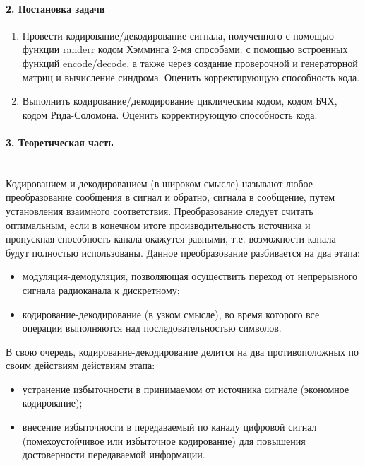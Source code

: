 \documentclass[12pt,a4paper]{report}
\begin{document}
\paragraph{2. Постановка задачи\\}
\begin{enumerate}
\item Провести кодирование/декодирование сигнала, полученного с
помощью функции randerr кодом Хэмминга 2-мя способами: с
помощью встроенных функций encode/decode, а также через
создание проверочной и генераторной матриц и вычисление
синдрома. Оценить корректирующую способность кода.
\item Выполнить кодирование/декодирование циклическим кодом,
кодом БЧХ, кодом Рида-Соломона. Оценить корректирующую
способность кода.
\end{enumerate}

\paragraph{3. Теоретическая часть \\\\}
Кодированием и декодированием (в широком смысле) называют любое преобразование сообщения в сигнал и обратно, сигнала в сообщение, путем установления взаимного соответствия. Преобразование следует считать оптимальным, если в конечном итоге производительность источника и пропускная способность канала окажутся равными, т.е. возможности канала будут полностью использованы. Данное преобразование разбивается на два этапа:
\begin{itemize}
\item модуляция-демодуляция, позволяющая осуществить переход от непрерывного сигнала радиоканала к дискретному;
\item кодирование-декодирование (в узком смысле), во время которого все операции выполняются над последовательностью символов.
\end{itemize}

В свою очередь, кодирование-декодирование делится на два противоположных по своим действиям действиям этапа:
\begin{itemize}
\item устранение избыточности в принимаемом от источника сигнале (экономное кодирование);
\item внесение избыточности в передаваемый по каналу цифровой сигнал (помехоустойчивое или избыточное кодирование) для повышения достоверности передаваемой информации.
\end{itemize}
\end{document}
